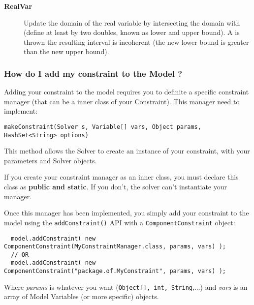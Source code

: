 \vspace{0.5cm}
\textbf{RealVar}

\begin{description}
\item[ ] 

Update the domain of the real variable by intersecting the domain with  (define at least by two doubles, known as lower and upper bound). A  is thrown the resulting interval is incoherent (the new lower bound is greater than the new upper bound).

\end{description}


\subsubsection{How do I add my constraint to the Model ?}\label{advanced:howdoiaddmyconstrainttothemodel}\hypertarget{advanced:howdoiaddmyconstrainttothemodel}{}

Adding your constraint to the model requires you to definite a specific constraint manager (that can be a inner class of your Constraint).
This manager need to implement:
\begin{lstlisting}
makeConstraint(Solver s, Variable[] vars, Object params, HashSet<String> options)
\end{lstlisting}
This method allows the Solver to create an instance of your constraint, with your parameters and Solver objects.

\begin{note}
If you create your constraint manager as an inner class, you must declare this class as \textbf{public and static}.
If you don't, the solver can't instantiate your manager.
\end{note}

Once this manager has been implemented, you simply add your constraint to the model using the \texttt{addConstraint()} API with a \texttt{ComponentConstraint} object:
\begin{lstlisting}
  model.addConstraint( new ComponentConstraint(MyConstraintManager.class, params, vars) );
  // OR
  model.addConstraint( new ComponentConstraint("package.of.MyConstraint", params, vars) );
\end{lstlisting}
Where \emph{params} is whatever you want (\texttt{Object[], int, String},...) and \emph{vars} is an array of Model Variables (or more specific) objects.

